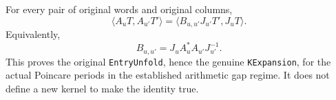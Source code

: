 \begin{theorem}
\label{global-gram-entry-unfold}
For every pair of original words and original columns,
\begin{equation}\label{global-gram-entry-equality}
 \langle A_uT,A_{u'}T'\rangle
   =\langle B_{u,u'}J_{u'}T',J_uT\rangle.
\end{equation}
Equivalently,
\begin{equation}\label{global-gram-hilbert-equality}
 B_{u,u'}=J_u A_u^*A_{u'}J_{u'}^{-1}.
\end{equation}
This proves the original \texttt{EntryUnfold}, hence the genuine
\texttt{KExpansion}, for the actual Poincare periods in the
established arithmetic gap regime.  It does not define a new
kernel to make the identity true.
\end{theorem}

